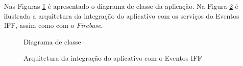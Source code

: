 Nas Figuras \ref{fig:classe} é apresentado o diagrama de classe da aplicação. Na Figura \ref{fig:arquitetura} é ilustrada a arquitetura da integração do aplicativo com os serviços do Eventos IFF, assim como com o \textit{Firebase}.

\begin{figure}[H]
    \centering
    \caption{Diagrama de classe}
    \label{fig:classe}
\end{figure}

\begin{figure}[H]
    \centering
    \caption{Arquitetura da integração do aplicativo com o Eventos IFF}
    \label{fig:arquitetura}
\end{figure}

